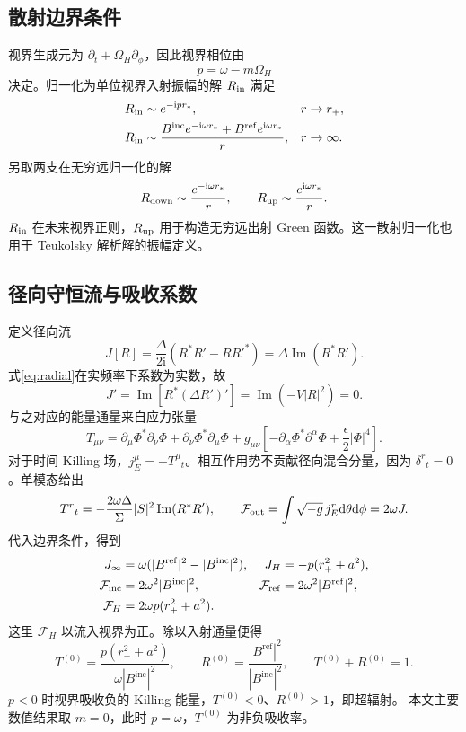 \documentclass[UTF8,fontset=fandol,11pt,a4paper]{ctexart}
\newcommand{\ii}{\mathrm i}
\newcommand{\dd}{\mathrm d}
\newcommand{\Ima}{\operatorname{Im}}
\newcommand{\Bin}{B^{\mathrm{inc}}}
\newcommand{\Bref}{B^{\mathrm{ref}}}
\numberwithin{equation}{section}
\begin{document}
\subsection{散射边界条件}
视界生成元为 $\partial_t+\Omega_H\partial_\phi$，因此视界相位由
\begin{equation}p=\omega-m\Omega_H\end{equation}
决定。归一化为单位视界入射振幅的解 $R_{\rm in}$ 满足
\begin{align}
R_{\rm in}&\sim e^{-\ii p r_*},&&r\to r_+,\label{eq:bcH}\\
R_{\rm in}&\sim\frac{\Bin e^{-\ii\omega r_*}+\Bref e^{\ii\omega r_*}}r,
&&r\to\infty.\label{eq:bcInf}
\end{align}
另取两支在无穷远归一化的解
\begin{equation}
R_{\rm down}\sim\frac{e^{-\ii\omega r_*}}r,\qquad
R_{\rm up}\sim\frac{e^{\ii\omega r_*}}r.
\end{equation}
$R_{\rm in}$ 在未来视界正则，$R_{\rm up}$ 用于构造无穷远出射 Green 函数。这一散射归一化也用于 Teukolsky 解析解的振幅定义\cite{MST1996}。

\subsection{径向守恒流与吸收系数}
定义径向流
\begin{equation}
J[R]=\frac{\Delta}{2\ii}(R^*R'-RR'^*)=\Delta\Ima(R^*R').
\end{equation}
式\eqref{eq:radial}在实频率下系数为实数，故
\begin{equation}J'=\Ima[R^*(\Delta R')']=\Ima(-V|R|^2)=0.\end{equation}
与之对应的能量通量来自应力张量
\begin{equation}
T_{\mu\nu}=\partial_\mu\Phi^*\partial_\nu\Phi+\partial_\nu\Phi^*\partial_\mu\Phi
+g_{\mu\nu}\left[-\partial_\alpha\Phi^*\partial^\alpha\Phi+\frac\epsilon2|\Phi|^4\right].
\end{equation}
对于时间 Killing 场，$j_E^\mu=-T^\mu{}_t$。相互作用势不贡献径向混合分量，因为 $\delta^r{}_t=0$。单模态给出
\begin{equation}
T^r{}_t=-\frac{2\omega\Delta}{\Sigma}|S|^2\Ima(R^*R'),\qquad
\mathcal F_{\rm out}=\int\sqrt{-g}\,j_E^r\dd\theta\dd\phi=2\omega J.
\end{equation}
代入边界条件，得到
\begin{align}
J_\infty&=\omega(|\Bref|^2-|\Bin|^2),&J_H&=-p(r_+^2+a^2),\\
\mathcal F_{\rm inc}&=2\omega^2|\Bin|^2,&\mathcal F_{\rm ref}&=2\omega^2|\Bref|^2,\\
\mathcal F_H&=2\omega p(r_+^2+a^2).
\end{align}
这里 $\mathcal F_H$ 以流入视界为正。除以入射通量便得
\begin{equation}
T^{(0)}=\frac{p(r_+^2+a^2)}{\omega|\Bin|^2},\qquad
R^{(0)}=\frac{|\Bref|^2}{|\Bin|^2},\qquad T^{(0)}+R^{(0)}=1.\label{eq:T0}
\end{equation}
$p<0$ 时视界吸收负的 Killing 能量，$T^{(0)}<0$、$R^{(0)}>1$，即超辐射。
本文主要数值结果取 $m=0$，此时 $p=\omega$，$T^{(0)}$ 为非负吸收率。
\end{document}
